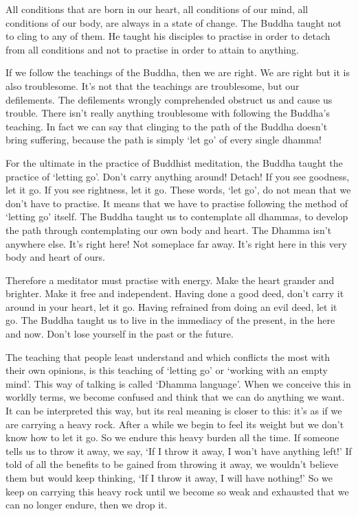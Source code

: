 All conditions that are born in our heart, all conditions of our mind, all conditions of our body, are always in a state of change. The Buddha taught not to cling to any of them. He taught his disciples to practise in order to detach from all conditions and not to practise in order to attain to anything.

If we follow the teachings of the Buddha, then we are right. We are right but it is also troublesome. It's not that the teachings are troublesome, but our defilements. The defilements wrongly comprehended obstruct us and cause us trouble. There isn't really anything troublesome with following the Buddha's teaching. In fact we can say that clinging to the path of the Buddha doesn't bring suffering, because the path is simply `let go' of every single dhamma!

For the ultimate in the practice of Buddhist meditation, the Buddha taught the practice of `letting go'. Don't carry anything around! Detach! If you see goodness, let it go. If you see rightness, let it go. These words, `let go', do not mean that we don't have to practise. It means that we have to practise following the method of `letting go' itself. The Buddha taught us to contemplate all dhammas, to develop the path through contemplating our own body and heart. The Dhamma isn't anywhere else. It's right here! Not someplace far away. It's right here in this very body and heart of ours.

Therefore a meditator must practise with energy. Make the heart grander and brighter. Make it free and independent. Having done a good deed, don't carry it around in your heart, let it go. Having refrained from doing an evil deed, let it go. The Buddha taught us to live in the immediacy of the present, in the here and now. Don't lose yourself in the past or the future.

The teaching that people least understand and which conflicts the most with their own opinions, is this teaching of `letting go' or `working with an empty mind'. This way of talking is called `Dhamma language'. When we conceive this in worldly terms, we become confused and think that we can do anything we want. It can be interpreted this way, but its real meaning is closer to this: it's as if we are carrying a heavy rock. After a while we begin to feel its weight but we don't know how to let it go. So we endure this heavy burden all the time. If someone tells us to throw it away, we say, `If I throw it away, I won't have anything left!' If told of all the benefits to be gained from throwing it away, we wouldn't believe them but would keep thinking, `If I throw it away, I will have nothing!' So we keep on carrying this heavy rock until we become so weak and exhausted that we can no longer endure, then we drop it.

